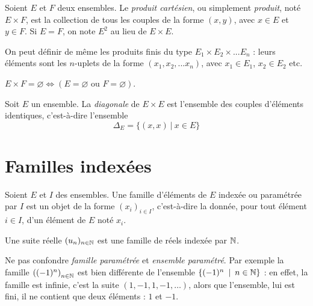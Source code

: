 \begin{definition}
Soient $E$ et $F$ deux ensembles. Le \emph{produit cartésien}, ou simplement \emph{produit}, noté $E\times F$, est la collection de tous les couples  de la forme $(x,y)$, avec $x\in E$ et $y\in F$. Si $E=F$, on note $E^2$ au lieu de $E\times E$. 

On peut définir de même les produits finis du type $E_1\times E_2 \times ... E_n$ : leurs éléments sont les $n$-uplets de la forme $(x_1, x_2, ... x_n)$, avec $x_1\in E_1$, $x_2\in E_2$ etc. 
\end{definition}

\begin{remarque}
$E\times F = \varnothing \iff \left( E=\varnothing\text{ ou }F=\varnothing\right)$.
\end{remarque}

\begin{definition}[Diagonale]
Soit $E$ un ensemble. La \emph{diagonale} de $E\times E$ est l'ensemble des couples d'éléments identiques, c'est-à-dire l'ensemble
\[
\Delta_E = \{(x,x)\:|\: x\in E\}
\]
\end{definition}

\section{Familles indexées}

\begin{definition}
Soient $E$ et $I$ des ensembles. Une famille d'éléments de $E$ indexée ou paramétrée par $I$ est un objet de la forme $(x_i)_{i\in I}$, c'est-à-dire la donnée, pour tout élément $i\in I$, d'un élément de $E$ noté $x_i$.
\end{definition}

\begin{exemple}
Une suite réelle $(u_n)_{n\in \mathbb{N}}$ est une famille de réels indexée par $\mathbb{N}$.
\end{exemple}

\begin{attention}
Ne pas confondre \emph{famille paramétrée} et \emph{ensemble paramétré}. Par exemple la famille $\left( (-1)^n \right)_{n\in \mathbb{N}}$ est bien différente de l'ensemble $\left\{(-1)^n\:\mid\:n\in \N\right\}$ : en effet, la famille est infinie, c'est la suite $(1,-1, 1,-1, \dots)$, alors que l'ensemble, lui est fini, il ne contient que deux éléments : $1$ et $-1$.
\end{attention}

